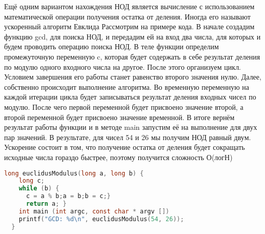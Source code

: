 \documentclass[fontsize=14bp]{report}
\begin{document}
Ещё одним вариантом нахождения НОД является вычисление с использованием математической операции получения остатка от деления. Иногда его называют ускоренный алгоритм Евклида
Рассмотрим на примере кода. В начале создадим функцию gcd, для поиска НОД, и передадим ей на вход два числа, для которых и будем проводить операцию поиска НОД. В теле функции определим промежуточную переменную c, которая будет содержать в себе результат деления по модулю одного входного числа на другое. После этого организуем цикл. Условием завершения его работы станет равенство второго значения нулю. Далее, собственно происходит выполнение алгоритма. Во временную переменную на каждой итерации цикла будет записываться результат деления входных чисел по модулю. После чего первой переменной будет присвоено значение второй, а второй переменной будет присвоено значение временной. В итоге вернём результат работы функции и в методе main запустим её на выполнение для двух пар значений. В результате, для чисел 54 и 26 мы получим НОД равный двум. Ускорение состоит в том, что получение остатка от деления будет сокращать исходные числа гораздо быстрее, поэтому получится сложность О(логН)

\begin{lstlisting}[language=C,style=CCodeStyle]
  long euclidusModulus(long a, long b) {
    long c;
    while (b) {
      c = a % b;a = b;b = c;}
      return a; }
    int main (int argc, const char * argv [])
    printf("GCD: %d\n", euclidusModulus(54, 26));
  }
\end{lstlisting}
\end{document}

